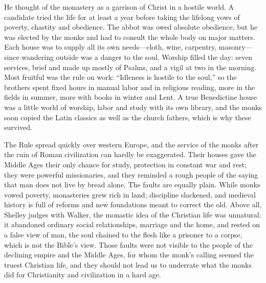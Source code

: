 He thought of the monastery as a garrison of Christ in a hostile world. A candidate tried the life for
at least a year before taking the lifelong vows of poverty, chastity and obedience. The abbot was owed
absolute obedience, but he was elected by the monks and had to consult the whole body on major
matters. Each house was to supply all its own needs---cloth, wine, carpentry, masonry---since
wandering outside was a danger to the soul. Worship filled the day: seven services, brief and made up
mostly of Psalms, and a vigil at two in the morning. Most fruitful was the rule on work: ``Idleness
is hostile to the soul,'' so the brothers spent fixed hours in manual labor and in religious reading,
more in the fields in summer, more with books in winter and Lent. A true Benedictine house was a
little world of worship, labor and study with its own library, and the monks soon copied the Latin
classics as well as the church fathers, which is why these survived.

The Rule spread quickly over western Europe, and the service of the monks after the ruin of Roman
civilization can hardly be exaggerated. Their houses gave the Middle Ages their only chance for
study, protection in constant war and rest; they were powerful missionaries, and they reminded a rough people of the saying that man does not live by bread alone. The faults are equally plain. While monks
vowed poverty, monasteries grew rich in land; discipline slackened, and medieval history is full of
reforms and new foundations meant to correct the old. Above all, Shelley judges with Walker, the
monastic idea of the Christian life was unnatural: it abandoned ordinary social relationships,
marriage and the home, and rested on a false view of man, the soul chained to the flesh like a
prisoner to a corpse, which is not the Bible's view. Those faults were not visible to the people of
the declining empire and the Middle Ages, for whom the monk's calling seemed the truest Christian
life, and they should not lead us to underrate what the monks did for Christianity and civilization
in a hard age.

\begin{keyfacts}
\end{keyfacts}
